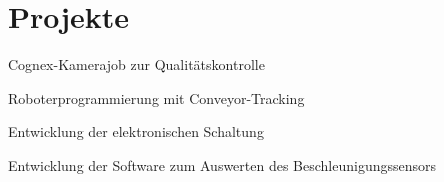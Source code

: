 \documentclass[]{plushcv}
\begin{document}
		\begin{minipage}[t]{0.48\textwidth}
			\section{\color{primary}Projekte}
			
			\vspace{0.5cm} %
			\begin{tightemize}
				\item Cognex-Kamerajob zur Qualitätskontrolle
				\item Roboterprogrammierung mit Conveyor-Tracking
			\end{tightemize}
			\sectionsep
			
			\vspace{0.1cm} %
			\begin{tightemize}
				\item Entwicklung der elektronischen Schaltung
				\item Entwicklung der Software zum Auswerten des Beschleunigungssensors
			\end{tightemize}
			\sectionsep
		\end{minipage}
		
	
\end{document}
